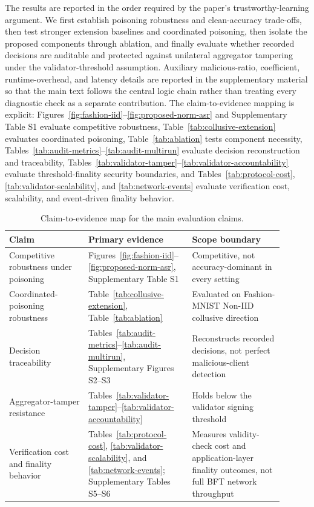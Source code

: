 \documentclass[preprint,12pt]{elsarticle}
\begin{document}
The results are reported in the order required by the paper's trustworthy-learning argument. We first establish poisoning robustness and clean-accuracy trade-offs, then test stronger extension baselines and coordinated poisoning, then isolate the proposed components through ablation, and finally evaluate whether recorded decisions are auditable and protected against unilateral aggregator tampering under the validator-threshold assumption. Auxiliary malicious-ratio, coefficient, runtime-overhead, and latency details are reported in the supplementary material so that the main text follows the central logic chain rather than treating every diagnostic check as a separate contribution. The claim-to-evidence mapping is explicit: Figures~\ref{fig:fashion-iid}--\ref{fig:proposed-norm-asr} and Supplementary Table S1 evaluate competitive robustness, Table~\ref{tab:collusive-extension} evaluates coordinated poisoning, Table~\ref{tab:ablation} tests component necessity, Tables~\ref{tab:audit-metrics}--\ref{tab:audit-multirun} evaluate decision reconstruction and traceability, Tables~\ref{tab:validator-tamper}--\ref{tab:validator-accountability} evaluate threshold-finality security boundaries, and Tables~\ref{tab:protocol-cost}, \ref{tab:validator-scalability}, and \ref{tab:network-events} evaluate verification cost, scalability, and event-driven finality behavior.

\begin{table}[t]
\centering
\caption{Claim-to-evidence map for the main evaluation claims.}
\label{tab:claim-evidence}
\small
\begin{tabular}{>{\raggedright\arraybackslash}p{0.26\linewidth}>{\raggedright\arraybackslash}p{0.34\linewidth}>{\raggedright\arraybackslash}p{0.30\linewidth}}
\toprule
Claim & Primary evidence & Scope boundary \\
\midrule
Competitive robustness under poisoning & Figures~\ref{fig:fashion-iid}--\ref{fig:proposed-norm-asr}, Supplementary Table S1 & Competitive, not accuracy-dominant in every setting \\
Coordinated-poisoning robustness & Table~\ref{tab:collusive-extension}, Table~\ref{tab:ablation} & Evaluated on Fashion-MNIST Non-IID collusive direction \\
Decision traceability & Tables~\ref{tab:audit-metrics}--\ref{tab:audit-multirun}, Supplementary Figures S2--S3 & Reconstructs recorded decisions, not perfect malicious-client detection \\
Aggregator-tamper resistance & Tables~\ref{tab:validator-tamper}--\ref{tab:validator-accountability} & Holds below the validator signing threshold \\
Verification cost and finality behavior & Tables~\ref{tab:protocol-cost}, \ref{tab:validator-scalability}, and \ref{tab:network-events}; Supplementary Tables S5--S6 & Measures validity-check cost and application-layer finality outcomes, not full BFT network throughput \\
\bottomrule
\end{tabular}
\end{table}
\end{document}
